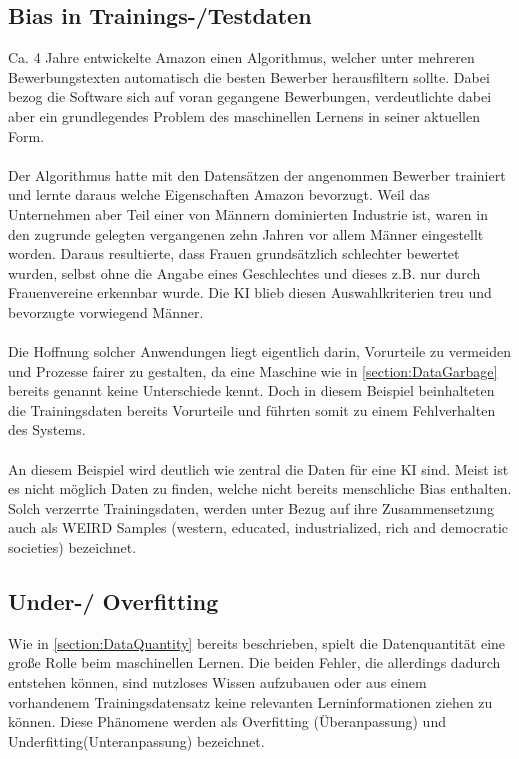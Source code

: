 \documentclass[12pt,oneside,a4paper,parskip]{scrbook}
\begin{document}
\subsection{Bias in Trainings-/Testdaten}
\label{section:biasInTest}
Ca. 4 Jahre entwickelte Amazon einen Algorithmus, welcher unter mehreren Bewerbungstexten automatisch die besten Bewerber herausfiltern sollte. Dabei bezog die Software sich auf voran gegangene Bewerbungen, verdeutlichte dabei aber ein grundlegendes Problem des maschinellen Lernens in seiner aktuellen Form.\\\\
Der Algorithmus hatte mit den Datensätzen der angenommen Bewerber trainiert und lernte daraus welche Eigenschaften Amazon bevorzugt. Weil das Unternehmen aber Teil einer von Männern dominierten Industrie ist, waren in den zugrunde gelegten vergangenen zehn Jahren vor allem Männer eingestellt worden. Daraus resultierte, dass Frauen grundsätzlich schlechter bewertet wurden, selbst ohne die Angabe eines Geschlechtes und dieses z.B. nur durch Frauenvereine erkennbar wurde. Die KI blieb diesen Auswahlkriterien treu und bevorzugte vorwiegend Männer.\cite{amazon}
\\\\
Die Hoffnung solcher Anwendungen liegt eigentlich darin, Vorurteile zu vermeiden und Prozesse fairer zu gestalten, da eine Maschine wie in \ref{section:DataGarbage} bereits genannt keine Unterschiede kennt. Doch in diesem Beispiel beinhalteten die Trainingsdaten bereits Vorurteile und führten somit zu einem Fehlverhalten des Systems.
\\\\
An diesem Beispiel wird deutlich wie zentral die Daten für eine KI sind.
Meist ist es nicht möglich Daten zu finden, welche nicht bereits menschliche Bias enthalten. Solch verzerrte Trainingsdaten, werden unter Bezug auf ihre Zusammensetzung auch als WEIRD Samples (western, educated, industrialized, rich and democratic societies) bezeichnet\cite{BiasInKi}.


\subsection{Under-/ Overfitting}
\label{section:OverUnderfitting}
Wie in \ref{section:DataQuantity} bereits beschrieben, spielt die Datenquantität eine große Rolle beim maschinellen Lernen. Die beiden Fehler, die allerdings dadurch entstehen können, sind nutzloses Wissen aufzubauen oder aus einem vorhandenem Trainingsdatensatz keine relevanten Lerninformationen ziehen zu können. Diese Phänomene werden als Overfitting (Überanpassung) und Underfitting(Unteranpassung) bezeichnet.
\end{document}
